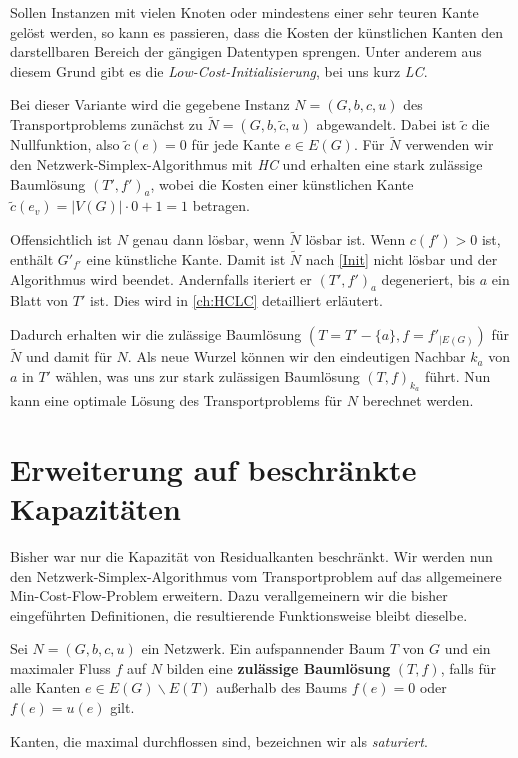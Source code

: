 Sollen Instanzen mit vielen Knoten oder mindestens einer sehr teuren Kante gelöst werden, so kann es passieren, dass die Kosten der künstlichen Kanten den darstellbaren Bereich der gängigen Datentypen sprengen. Unter anderem aus diesem Grund gibt es die \emph{Low-Cost-Initialisierung}, bei uns kurz \emph{LC}.

Bei dieser Variante wird die gegebene Instanz $N=(G,b,c,u)$ des Transportproblems zunächst zu $\tilde{N}=(G,b,\tilde{c},u)$ abgewandelt. Dabei ist $\tilde{c}$ die Nullfunktion, also $\tilde{c}(e)=0$ für jede Kante $e\in E(G)$. Für $\tilde{N}$ verwenden wir den Netzwerk-Simplex-Algorithmus mit \emph{HC} und erhalten eine stark zulässige Baumlösung $(T',f')_a$, wobei die Kosten einer künstlichen Kante $\tilde{c}(e_v)=|V(G)|\cdot0+1=1$ betragen.

Offensichtlich ist $N$ genau dann lösbar, wenn $\tilde{N}$ lösbar ist. Wenn $c(f')>0$ ist, enthält $G'_{f'}$ eine künstliche Kante. Damit ist $\tilde{N}$ nach \cref{Init} nicht lösbar und der Algorithmus wird beendet. Andernfalls iteriert er $(T',f')_a$ degeneriert, bis $a$ ein Blatt von $T'$ ist. Dies wird in \cref{ch:HCLC} detailliert erläutert.

Dadurch erhalten wir die zulässige Baumlösung $(T=T'-\{a\}, f=f'_{|E(G)})$ für $\tilde{N}$ und damit für $N$. Als neue Wurzel können wir den eindeutigen Nachbar $k_a$ von $a$ in $T'$ wählen, was uns zur stark zulässigen Baumlösung $(T,f)_{k_a}$ führt. Nun kann eine optimale Lösung des Transportproblems für $N$ berechnet werden.

\section{Erweiterung auf beschränkte Kapazitäten}\label{ch:alg2}
Bisher war nur die Kapazität von Residualkanten beschränkt. Wir werden nun den Netzwerk-Simplex-Algorithmus vom Transportproblem auf das allgemeinere Min-Cost-Flow-Problem erweitern. Dazu verallgemeinern wir die bisher eingeführten Definitionen, die resultierende Funktionsweise bleibt dieselbe.

\begin{defn}Sei $N=(G,b,c,u)$ ein Netzwerk. Ein aufspannender Baum $T$ von $G$ und ein maximaler Fluss $f$ auf $N$ bilden eine \textbf{zulässige Baumlösung} $(T,f)$, falls für alle Kanten $e\in E(G)\backslash E(T)$ außerhalb des Baums $f(e) = 0$ oder $f(e)=u(e)$ gilt.\end{defn}
\begin{anm}Kanten, die maximal durchflossen sind, bezeichnen wir als \emph{saturiert}.\end{anm}

